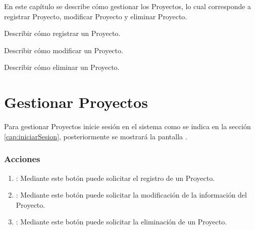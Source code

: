 
En este capítulo se describe cómo gestionar los Proyectos, lo cual corresponde a registrar Proyecto, modificar Proyecto y eliminar Proyecto.\\


\begin{objetivos}
	\item Describir cómo registrar un Proyecto.
	\item Describir cómo modificar un Proyecto.
	\item Describir cómo eliminar un Proyecto.
\end{objetivos}

\section{Gestionar Proyectos}

Para gestionar Proyectos inicie sesión en el sistema como se indica en la sección \ref{cap:iniciarSesion}, posteriormente se mostrará la pantalla . 


\subsubsection{Acciones}

\begin{enumerate}
	\item {}: Mediante este botón puede solicitar el registro de un Proyecto.
	\item {}: Mediante este botón puede solicitar la modificación de la información del Proyecto.
	\item {}: Mediante este botón puede solicitar la eliminación de un Proyecto.
\end{enumerate}





